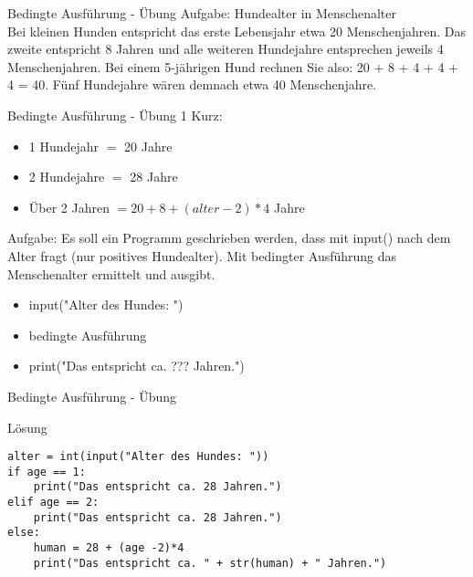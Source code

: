 \begin{frame}{Bedingte Ausführung - Übung}
Aufgabe: Hundealter in Menschenalter\\
Bei kleinen Hunden entspricht das erste Lebensjahr etwa 20 Menschenjahren. Das zweite entspricht 8 Jahren und alle weiteren Hundejahre entsprechen jeweils 4 Menschenjahren. Bei einem 5-jährigen Hund rechnen Sie also: 20 + 8 + 4 + 4 + 4 = 40. Fünf Hundejahre wären demnach etwa 40 Menschenjahre.\\
\end{frame}
\begin{frame}{Bedingte Ausführung - Übung 1}
Kurz:
\begin{itemize}
\item 1 Hundejahr $=$ 20 Jahre
\item 2 Hundejahre $=$ 28 Jahre
\item Über 2 Jahren $= 20 + 8 + (alter - 2)  *  4$ Jahre
\end{itemize}
Aufgabe:
Es soll ein Programm geschrieben werden, dass mit input() nach dem Alter fragt (nur positives Hundealter). Mit bedingter Ausführung das Menschenalter ermittelt und ausgibt.
\begin{itemize}
	\item input("Alter des Hundes: ")
	\item bedingte Ausführung
	\item print("Das entspricht ca. ??? Jahren.")
\end{itemize}

\end{frame}

\begin{frame}[fragile]{Bedingte Ausführung - Übung}
\begin{exampleblock}{Lösung}
\begin{lstlisting}
alter = int(input("Alter des Hundes: "))
if age == 1:
	print("Das entspricht ca. 28 Jahren.")
elif age == 2:
	print("Das entspricht ca. 28 Jahren.")
else:
	human = 28 + (age -2)*4
	print("Das entspricht ca. " + str(human) + " Jahren.")
\end{lstlisting}
\end{exampleblock}
\end{frame}



